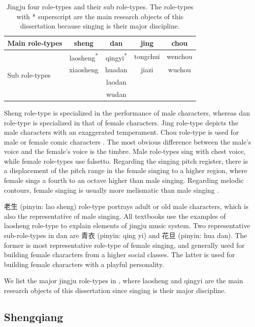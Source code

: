 \begin{table}[ht!]
\centering
\begin{tabular}{l|cccc}
\toprule
Main role-types & sheng               & dan                           & jing & chou \\
\midrule
\multirow{4}{*}{Sub role-types} & laosheng\textsuperscript{*} & qingyi\textsuperscript{*} & tongchui    & wenchou   \\
& xiaosheng & huadan & jiazi & wuchou \\
&&laodan&& \\
&&wudan&& \\
\bottomrule
\end{tabular}
\caption{Jingju four role-types and their sub role-types. The role-types with * superscript are the main research objects of this dissertation because singing is their major discipline.}
\label{tab:role-types}
\end{table}

Sheng role-type is specialized in the performance of male characters, whereas dan role-type is specialized in that of female characters. Jing role-type depicts the male characters with an exaggerated temperament. Chou role-type is used for male or female comic characters \cite{Repetto2018}. The most obvious difference between the male’s voice and the female’s voice is the timbre. Male role-types sing with chest voice, while female role-types use falsetto. Regarding the singing pitch register, there is a displacement of the pitch range in the female singing to a higher region, where female sings a fourth to an octave higher than male singing. Regarding melodic contours, female singing is usually more melismatic than male singing \cite{Wichmann1991a}. 

老生 (pinyin: lao sheng) role-type portrays adult or old male characters, which is also the representative of male singing. All textbooks use the examples of laosheng role-type to explain elements of jingju music system. Two representative sub-role-types in dan are 青衣 (pinyin: qing yi) and 花旦 (pinyin: hua dan). The former is most representative role-type of female singing, and generally used for building female characters from a higher social classes. The latter is used for building female characters with a playful personality.

We list the major jingju role-types in , where laosheng and qingyi are the main research objects of this dissertation since singing is their major discipline.

\subsection{Shengqiang}


